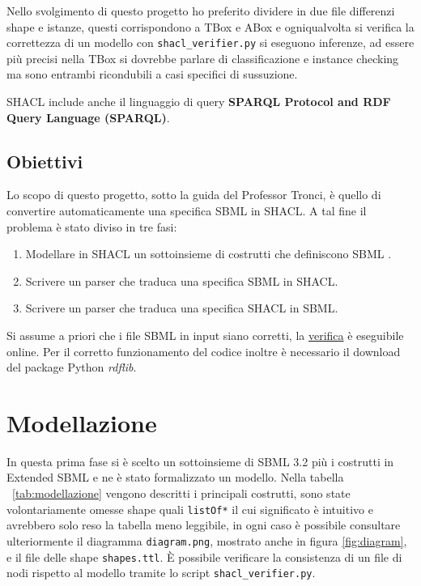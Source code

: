 \documentclass{article}
\begin{document}
Nello svolgimento di questo progetto ho preferito dividere in due file differenzi shape e istanze, questi corrispondono a TBox e ABox e ogniqualvolta si verifica la correttezza di un modello con \texttt{shacl\_verifier.py} si eseguono inferenze, ad essere più precisi nella TBox si dovrebbe parlare di classificazione e instance checking ma sono entrambi ricondubili a casi specifici di sussuzione.

SHACL include anche il linguaggio di query \textbf{SPARQL Protocol and RDF Query Language (SPARQL)}.

\subsection{Obiettivi}

Lo scopo di questo progetto, sotto la guida del Professor Tronci, è quello di convertire automaticamente una specifica SBML in SHACL. A tal fine il problema è stato diviso in tre fasi:

\begin{enumerate}
    \item Modellare in SHACL un sottoinsieme di costrutti che definiscono SBML . 
    \item Scrivere un parser che traduca una specifica SBML in SHACL.
    \item Scrivere un parser che traduca una specifica SHACL in SBML.
\end{enumerate}

Si assume a priori che i file SBML in input siano corretti, la \href{http://sbml.org/Facilities/Validator}{verifica} è eseguibile online. Per il corretto funzionamento del codice inoltre è necessario il download del package Python \textit{rdflib}.

\section{Modellazione}

In questa prima fase si è scelto un sottoinsieme di SBML 3.2 più i costrutti in Extended SBML e ne è stato formalizzato un modello. Nella tabella ~\ref{tab:modellazione} vengono descritti i principali costrutti, sono state volontariamente omesse shape quali \texttt{listOf*} il cui significato è intuitivo e avrebbero solo reso la tabella meno leggibile, in ogni caso è possibile consultare ulteriormente il diagramma \texttt{diagram.png}, mostrato anche in figura \ref{fig:diagram}, e il file delle shape \texttt{shapes.ttl}. È possibile verificare la consistenza di un file di nodi rispetto al modello tramite lo script \texttt{shacl\_verifier.py}.
\end{document}
